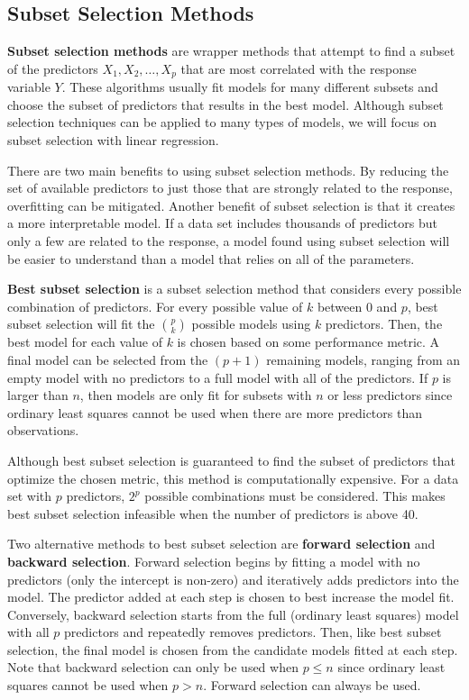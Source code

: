 \documentclass{article}
\begin{document}
	\subsection{Subset Selection Methods}
	
	\textbf{Subset selection methods} are wrapper methods that attempt to find a subset of the predictors $X_1, X_2, \dotsc, X_p$ that are most correlated with the response variable $Y$. These algorithms usually fit models for many different subsets and choose the subset of predictors that results in the best model. Although subset selection techniques can be applied to many types of models, we will focus on subset selection with linear regression.
	
	There are two main benefits to using subset selection methods. By reducing the set of available predictors to just those that are strongly related to the response, overfitting can be mitigated. Another benefit of subset selection is that it creates a more interpretable model. If a data set includes thousands of predictors but only a few are related to the response, a model found using subset selection will be easier to understand than a model that relies on all of the parameters. 
	
	\textbf{Best subset selection} is a subset selection method that considers every possible combination of predictors. For every possible value of $k$ between 0 and $p$, best subset selection will fit the ${p\choose k}$ possible models using $k$ predictors. Then, the best model for each value of $k$ is chosen based on some performance metric. A final model can be selected from the $(p + 1)$ remaining models, ranging from an empty model with no predictors to a full model with all of the predictors. If $p$ is larger than $n$, then models are only fit for subsets with $n$ or less predictors since ordinary least squares cannot be used when there are more predictors than observations.
	
	Although best subset selection is guaranteed to find the subset of predictors that optimize the chosen metric, this method is computationally expensive. For a data set with $p$ predictors, $2^p$ possible combinations must be considered. This makes best subset selection infeasible when the number of predictors is above 40.
	
	Two alternative methods to best subset selection are \textbf{forward selection} and \textbf{backward selection}. Forward selection begins by fitting a model with no predictors (only the intercept is non-zero) and iteratively adds predictors into the model. The predictor added at each step is chosen to best increase the model fit. Conversely, backward selection starts from the full (ordinary least squares) model with all $p$ predictors and repeatedly removes predictors. Then, like best subset selection, the final model is chosen from the candidate models fitted at each step. Note that backward selection can only be used when $p\leq n$ since ordinary least squares cannot be used when $p>n$. Forward selection can always be used.
	
\end{document}
